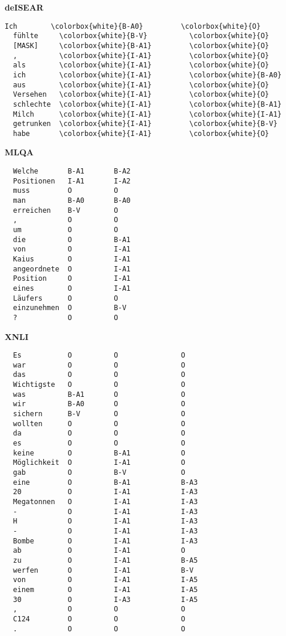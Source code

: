 \textbf{deISEAR}

\begin{Verbatim}[commandchars=\\\{\}]
  Ich        \colorbox{white}{B-A0}         \colorbox{white}{O}
  fühlte     \colorbox{white}{B-V}          \colorbox{white}{O}
  [MASK]     \colorbox{white}{B-A1}         \colorbox{white}{O}
  ,          \colorbox{white}{I-A1}         \colorbox{white}{O}
  als        \colorbox{white}{I-A1}         \colorbox{white}{O}
  ich        \colorbox{white}{I-A1}         \colorbox{white}{B-A0}
  aus        \colorbox{white}{I-A1}         \colorbox{white}{O}
  Versehen   \colorbox{white}{I-A1}         \colorbox{white}{O}
  schlechte  \colorbox{white}{I-A1}         \colorbox{white}{B-A1}
  Milch      \colorbox{white}{I-A1}         \colorbox{white}{I-A1}
  getrunken  \colorbox{white}{I-A1}         \colorbox{white}{B-V}
  habe       \colorbox{white}{I-A1}         \colorbox{white}{O}
\end{Verbatim}

\textbf{MLQA}

\begin{verbatim}
  Welche       B-A1       B-A2
  Positionen   I-A1       I-A2
  muss         O          O
  man          B-A0       B-A0
  erreichen    B-V        O
  ,            O          O
  um           O          O
  die          O          B-A1
  von          O          I-A1
  Kaius        O          I-A1
  angeordnete  O          I-A1
  Position     O          I-A1
  eines        O          I-A1
  Läufers      O          O
  einzunehmen  O          B-V
  ?            O          O
\end{verbatim}

\textbf{XNLI}

\begin{verbatim}
  Es           O          O               O
  war          O          O               O
  das          O          O               O
  Wichtigste   O          O               O
  was          B-A1       O               O
  wir          B-A0       O               O
  sichern      B-V        O               O
  wollten      O          O               O
  da           O          O               O
  es           O          O               O
  keine        O          B-A1            O
  Möglichkeit  O          I-A1            O
  gab          O          B-V             O
  eine         O          B-A1            B-A3
  20           O          I-A1            I-A3
  Megatonnen   O          I-A1            I-A3
  -            O          I-A1            I-A3
  H            O          I-A1            I-A3
  -            O          I-A1            I-A3
  Bombe        O          I-A1            I-A3
  ab           O          I-A1            O
  zu           O          I-A1            B-A5
  werfen       O          I-A1            B-V
  von          O          I-A1            I-A5
  einem        O          I-A1            I-A5
  30           O          I-A3            I-A5
  ,            O          O               O
  C124         O          O               O
  .            O          O               O
\end{verbatim}


